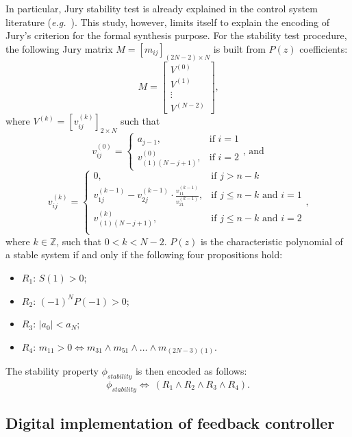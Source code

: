 \documentclass[runningheads,a4paper]{llncs}
\begin{document}
In particular, Jury stability test is already explained in the control system 
literature ({\it e.g.}~\cite{fadali}). This study, however, limits itself to 
explain the encoding of Jury's criterion for the formal synthesis purpose. 
For the stability  test procedure, the following Jury matrix 
$M=[m_{ij}]_{(2N-2)\times N}$ is built  from $P(z)$ coefficients:
$$
M=\left[
\begin{matrix}
  V^{(0)} \\
  V^{(1)} \\
  \vdots \\
  V^{(N-2)}
 \end{matrix}
\right]\mbox{,}
$$
\noindent where $V^{(k)}=[v^{(k)}_{ij}]_{2\times N}$ such that
$$
v^{(0)}_{ij}=\begin{cases} 
a_{j-1}, & \mbox{if } i=1 \\   v^{(0)}_{(1)(N-j+1)}, & \mbox{if } i=2 
\end{cases}\mbox{, and} 
$$
$$
v^{(k)}_{ij}=\begin{cases} 
0, & \mbox{if } j>n-k\\
v^{(k-1)}_{1j}-v^{(k-1)}_{2j}\cdot\frac{v^{(k-1)}_{11}}{v^{(k-1)}_{21}}, & \mbox{if } j\leq n-k  \mbox{ and } i=1 \\
v^{(k)}_{(1)(N-j+1)}, & \mbox{if } j\leq n-k \mbox{ and } i=2 \\
\end{cases} \mbox{,}
$$
\noindent where $k\in\mathbb{Z}$, such that $0<k<N-2$. $P(z)$ is the 
characteristic polynomial of a stable system if and only if the following 
four propositions hold:
\begin{itemize}
\item $R_{1}$: $S(1)>0$;
\item $R_{2}$: $(-1)^{N}P(-1)>0$;
\item $R_{3}$: $\vert{a_{0}}\vert <a_{N}$;
\item $R_{4}$: $m_{11}>0\iff m_{31}\wedge m_{51}\wedge \dots \wedge m_{(2N-3)(1)}$.
\end{itemize}

The stability property $\phi_{stability}$ is then encoded as follows:
$$
\phi_{stability}\iff \ (R_{1} \wedge R_{2} \wedge R_{3} \wedge R_{4}).
$$



\subsection{Digital implementation of feedback controller}
\label{ssec:quantizationerror}
\end{document}
